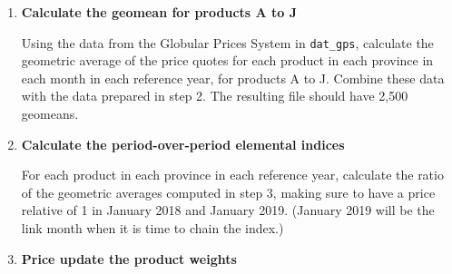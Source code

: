 \documentclass[]{article}
\newenvironment{Shaded}{\begin{snugshade}}{\end{snugshade}}
\newcommand{\CommentTok}[1]{\textcolor[rgb]{0.56,0.35,0.01}{\textit{#1}}}
\newcommand{\DataTypeTok}[1]{\textcolor[rgb]{0.13,0.29,0.53}{#1}}
\newcommand{\KeywordTok}[1]{\textcolor[rgb]{0.13,0.29,0.53}{\textbf{#1}}}
\newcommand{\NormalTok}[1]{#1}
\newcommand{\OperatorTok}[1]{\textcolor[rgb]{0.81,0.36,0.00}{\textbf{#1}}}
\newcommand{\StringTok}[1]{\textcolor[rgb]{0.31,0.60,0.02}{#1}}
\begin{document}
\begin{enumerate}
\begin{Shaded}
\end{Shaded}
\item
  \textbf{Calculate the geomean for products A to J}

  Using the data from the Globular Prices System in \texttt{dat\_gps}, calculate the geometric average of the price quotes for each product in each province in each month in each reference year, for products A to J. Combine these data with the data prepared in step 2. The resulting file should have 2,500 geomeans.

\begin{Shaded}
\end{Shaded}
\item
  \textbf{Calculate the period-over-period elemental indices}

  For each product in each province in each reference year, calculate the ratio of the geometric averages computed in step 3, making sure to have a price relative of 1 in January 2018 and January 2019. (January 2019 will be the link month when it is time to chain the index.)

\begin{Shaded}
\end{Shaded}
\item
  \textbf{Price update the product weights}


\end{enumerate}
\end{document}
